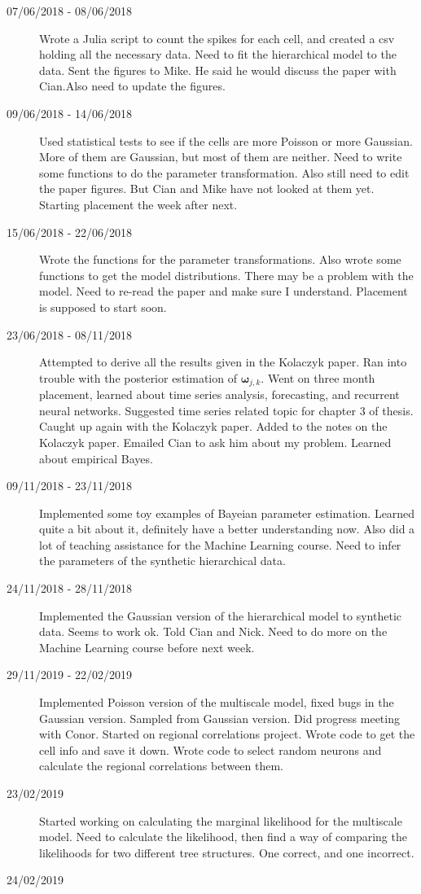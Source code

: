 \documentclass[a4paper,12pt]{article}
\theoremstyle{definition}
\begin{document}
\begin{description}
        \item[07/06/2018 - 08/06/2018] Wrote a Julia script to count the spikes for each cell, and created a csv holding all the necessary data. Need to fit the hierarchical model to the data. Sent the figures to Mike. He said he would discuss the paper with Cian.Also need to update the figures.

        \item[09/06/2018 - 14/06/2018] Used statistical tests to see if the cells are more Poisson or more Gaussian. More of them are Gaussian, but most of them are neither. Need to write some functions to do the parameter transformation. Also still need to edit the paper figures. But Cian and Mike have not looked at them yet. Starting placement the week after next.

        \item[15/06/2018 - 22/06/2018] Wrote the functions for the parameter transformations. Also wrote some functions to get the model distributions. There may be a problem with the model. Need to re-read the paper and make sure I understand. Placement is supposed to start soon.

				\item[23/06/2018 - 08/11/2018] Attempted to derive all the results given in the Kolaczyk paper. Ran into trouble with the posterior estimation of $\boldsymbol{\omega}_{j,k}$. Went on three month placement, learned about time series analysis, forecasting, and recurrent neural networks. Suggested time series related topic for chapter 3 of thesis. Caught up again with the Kolaczyk paper. Added to the notes on the Kolaczyk paper. Emailed Cian to ask him about my problem. Learned about empirical Bayes.

				\item[09/11/2018 - 23/11/2018] Implemented some toy examples of Bayeian parameter estimation. Learned quite a bit about it, definitely have a better understanding now. Also did a lot of teaching assistance for the Machine Learning course. Need to infer the parameters of the synthetic hierarchical data.

				\item[24/11/2018 - 28/11/2018] Implemented the Gaussian version of the hierarchical model to synthetic data. Seems to work ok. Told Cian and Nick. Need to do more on the Machine Learning course before next week.

				\item[29/11/2019 - 22/02/2019] Implemented Poisson version of the multiscale model, fixed bugs in the Gaussian version. Sampled from Gaussian version. Did progress meeting with Conor. Started on regional correlations project. Wrote code to get the cell info and save it down. Wrote code to select random neurons and calculate the regional correlations between them.

				\item[23/02/2019] Started working on calculating the marginal likelihood for the multiscale model. Need to calculate the likelihood, then find a way of comparing the likelihoods for two different tree structures. One correct, and one incorrect.

				\item[24/02/2019]
\end{description}
\end{document}
